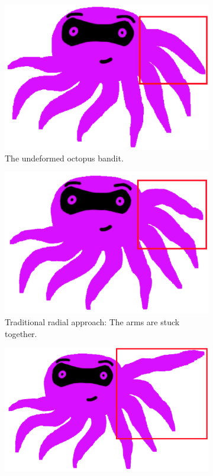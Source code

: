 \documentclass[11pt,a4paper, final, twoside]{article}
\theoremstyle{proposition}
\theoremstyle{definition}
\theoremstyle{remark}
\numberwithin{equation}{section}
\begin{document}
\begin{figure}[h]
\centering
\begin{subfigure}[t]{.5\textwidth}
  \centering
  \includegraphics[width=.9\linewidth]{octoUndefRed.png}
  \caption{The undeformed octopus bandit.}
\end{subfigure}
\begin{subfigure}[t]{.5\textwidth}
  \centering
  \includegraphics[width=.9\linewidth]{octoConnectRed.png}
  \caption{Traditional radial approach: The arms are stuck together.}
\end{subfigure}%
\begin{subfigure}[t]{.5\textwidth}
  \centering
  \includegraphics[width=1\linewidth]{octoHelloRed.png}

\end{subfigure}
\end{figure}
\end{document}
